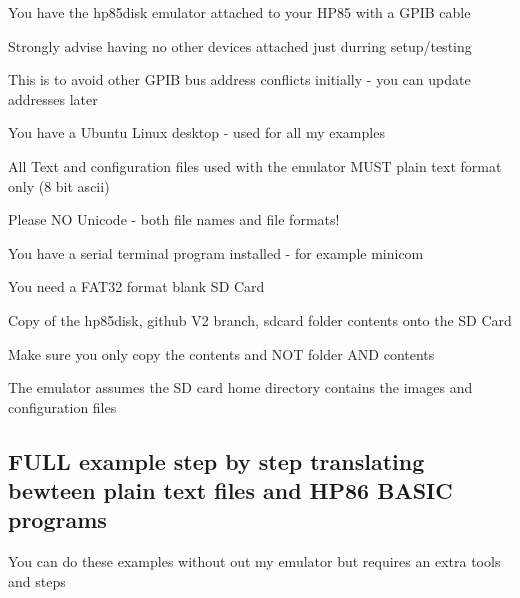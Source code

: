 \begin{DoxyItemize}
\item You have the hp85disk emulator attached to your H\+P85 with a G\+P\+IB cable
\begin{DoxyItemize}
\item Strongly advise having no other devices attached just durring setup/testing
\begin{DoxyItemize}
\item This is to avoid other G\+P\+IB bus address conflicts initially -\/ you can update addresses later
\end{DoxyItemize}
\end{DoxyItemize}
\item You have a Ubuntu Linux desktop -\/ used for all my examples
\item All Text and configuration files used with the emulator M\+U\+ST plain text format only (8 bit ascii)
\begin{DoxyItemize}
\item Please NO Unicode -\/ both file names and file formats!
\end{DoxyItemize}
\item You have a serial terminal program installed -\/ for example minicom
\item You need a F\+A\+T32 format blank SD Card
\begin{DoxyItemize}
\item Copy of the hp85disk, github V2 branch, sdcard folder contents onto the SD Card
\begin{DoxyItemize}
\item Make sure you only copy the contents and N\+OT folder A\+ND contents
\begin{DoxyItemize}
\item The emulator assumes the SD card home directory contains the images and configuration files
\end{DoxyItemize}
\end{DoxyItemize}
\end{DoxyItemize}
\end{DoxyItemize}





\subsection*{F\+U\+LL example step by step translating bewteen plain text files and H\+P86 B\+A\+S\+IC programs}


\begin{DoxyItemize}
\item You can do these examples without out my emulator but requires an extra tools and steps
\end{DoxyItemize}

